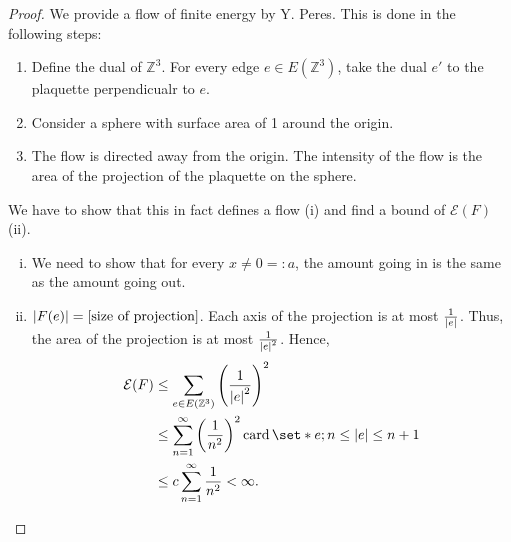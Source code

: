 \begin{proof}
    We provide a flow of finite energy by Y. Peres. This is done in the following steps:
    \begin{enumerate}[1.]
      \item Define the dual of \(\mathbb{Z}^3\). For every edge \(e \in E(\mathbb{Z}^3)\), take the dual \(e'\) to the plaquette perpendicualr to \(e\). 
      \item Consider a sphere with surface area of 1 around the origin.
      \item The flow is directed away from the origin. The intensity of the flow is the area of the projection of the plaquette on the sphere.
    \end{enumerate}
    We have to show that this in fact defines a flow (i) and find a bound of \(\mathcal{E}(F)\) (ii). 
    \begin{enumerate}[(i)]
      \item We need to show that for every \(x \neq 0 =: a\), the amount going in is the same as the amount going out.
      \item \(\abs{F(e)} = \text{[size of projection]}\). Each axis of the projection is at most \(\frac{1}{\abs{e} }\). Thus, the area of the projection is at most \(\frac{1}{\abs{e}^2} \). Hence, 
        \begin{align*}
          \mathcal{E}(F) &\leq \sum_{e \in E(\mathbb{Z}^3)} \left(\frac{1}{\abs{e} ^2}\right)^2 \\
            &\leq\sum_{n=1}^{\infty} \left(\frac{1}{n^2}\right)^2  \operatorname{card}\set*{e; n \leq \abs{e} \leq n+1}\\
            &\leq c \sum_{n=1}^{\infty} \frac{1}{n^2} < \infty.
        \end{align*}
        
    \end{enumerate}
    
\end{proof}


